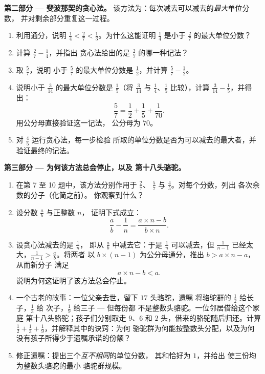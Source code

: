 \begin{problem}
\medskip
\noindent\textbf{第二部分 --- 斐波那契的贪心法。}
该方法为：每次减去可以减去的\emph{最大}单位分数，
并对剩余部分重复这一过程。
\begin{enumerate}[resume]
  \item 利用通分，说明
        $\frac14 < \frac27 < \frac13$。为什么这能证明
        $\frac14$ 是小于
        $\frac27$ 的最大单位分数？
  \item 计算 $\frac27 - \frac14$，并指出
        贪心法给出的是 $\frac27$ 的哪一种记法？
  \item 取 $\frac57$，说明
        小于 $\frac57$ 的最大单位分数是 $\frac12$，并计算
        $\frac57 - \frac12$。
  \item 说明小于
        $\frac{3}{14}$ 的最大单位分数是 $\frac15$（将 $\frac{3}{14}$ 与
        $\frac14$、$\frac15$ 比较），计算
        $\frac{3}{14} - \frac15$，并得出：
        \[
        \frac57 = \frac12 + \frac15 + \frac{1}{70} .
        \]
        用公分母直接验证这一记法，
        公分母为 $70$。
  \item 对 $\frac45$ 运行贪心法，每一步检验
        所取的单位分数是否为可以减去的最大者，并
        验证最终的记法。
\end{enumerate}

\medskip
\noindent\textbf{第三部分 --- 为何该方法总会停止，以及
第十八头骆驼。}
\begin{enumerate}[resume]
  \item 在第 7 至 10 题中，该方法分别作用于 $\frac27$、
        $\frac57$ 与 $\frac45$。对每个分数，列出
        各次余数的分子（化简之前）。
        你观察到什么？
  \item 设分数 $\frac ab$ 与正整数 $n$，
        证明下式成立：
        \[
        \frac{a}{b} - \frac{1}{n}
        = \frac{a \times n - b}{b \times n} .
        \]
  \item 设贪心法减去的是 $\frac1n$，
        即从 $\frac ab$ 中减去它：于是 $\frac1n$ 可以减去，但 $\frac{1}{n-1}$
        已经太大，$\frac{1}{n-1} > \frac ab$。将两者
        以 $b \times (n - 1)$ 为公分母通分，推出
        $b > a \times n - a$，从而新分子
        满足
        \[
        a \times n - b < a .
        \]
        说明为何这证明了该方法总会停止。
  \item 一个古老的故事：一位父亲去世，留下 $17$ 头骆驼，遗嘱
        将骆驼群的 $\frac12$ 给长子，$\frac13$ 给
        次子，$\frac19$ 给三子 --- 但每份都
        不是整数头骆驼。一位邻居借给这个家庭
        第十八头骆驼；孩子们分别取走 $9$、$6$ 和
        $2$ 头，借来的骆驼随后归还。计算
        $\frac12 + \frac13 + \frac19$，并解释其中的诀窍：为何
        骆驼群为何能按整数头分配，以及为何
        没有孩子所得少于遗嘱承诺的份额？
  \item 修正遗嘱：提出三个\emph{互不相同}的单位分数，
        其和恰好为 $1$，并给出
        使三份均为整数头骆驼的最小
        骆驼群规模。
\end{enumerate}
\end{problem}

